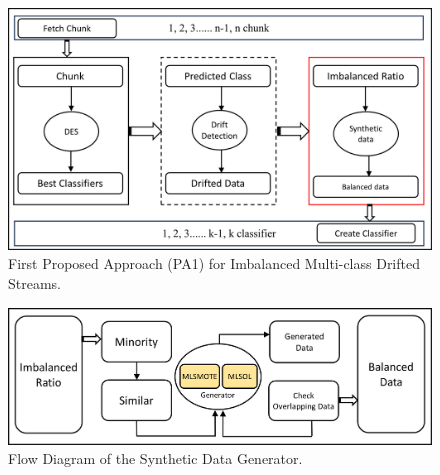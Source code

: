 \begin{figure}[!ht]
	\centering
	\includegraphics[width=1\linewidth]{4_Imbalanced/figures/approach_step_1.png}
	\caption{First Proposed Approach (PA1) for Imbalanced Multi-class Drifted Streams.}
	\label{fig:4_first_proposal_step_1}
\end{figure}
\begin{figure}[!ht]
	\centering
	\includegraphics[width=1\linewidth]{4_Imbalanced/figures/approach_step_2.png}
	\caption{Flow Diagram of the Synthetic Data Generator.}
	\label{fig:4_first_proposal_step_2}
\end{figure}


